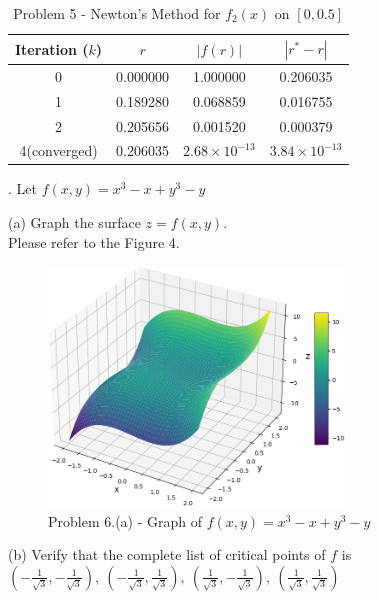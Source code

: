 \documentclass{article} %
\begin{document}
{        \begin{table}[h!]
        \centering
        \begin{tabular}{cccc}
        \toprule
        Iteration ($k$) & $r$ & $|f(r)|$ & $|r^* - r|$ \\
        \midrule
        0 & 0.000000 & 1.000000 & 0.206035 \\
        1 & 0.189280 & 0.068859 & 0.016755 \\
        2 & 0.205656 & 0.001520 & 0.000379 \\
        4(converged) & 0.206035 & $2.68 \times 10^{-13}$ & $3.84 \times 10^{-13}$ \\
        \bottomrule
        \end{tabular}
        \caption{Problem 5 - Newton's Method for $f_2(x)$ on $[0, 0.5]$}
        \label{tab:newton_f2}
    \end{table}

    . Let $ f(x, y) = x^3 - x + y^3 - y $

    \noindent(a) Graph the surface $ z = f(x, y) $. \\

    Please refer to the Figure 4. \\

    \begin{figure}[h!]
    \centering
    \includegraphics[width=0.7\textwidth]{generated_image3.png}
    \caption{Problem 6.(a) - Graph of $f(x, y) = x^3 - x + y^3 - y$}
    \label{fig4}
    \end{figure}

    \noindent (b) Verify that the complete list of critical points of $ f $ is
    \( %
    \left(-\frac{1}{\sqrt{3}}, -\frac{1}{\sqrt{3}}\right),\ %
    \left(-\frac{1}{\sqrt{3}}, \frac{1}{\sqrt{3}}\right),\ 
    \left(\frac{1}{\sqrt{3}}, -\frac{1}{\sqrt{3}}\right),\ 
    \left(\frac{1}{\sqrt{3}}, \frac{1}{\sqrt{3}}\right)
    \)

}
\end{document}
